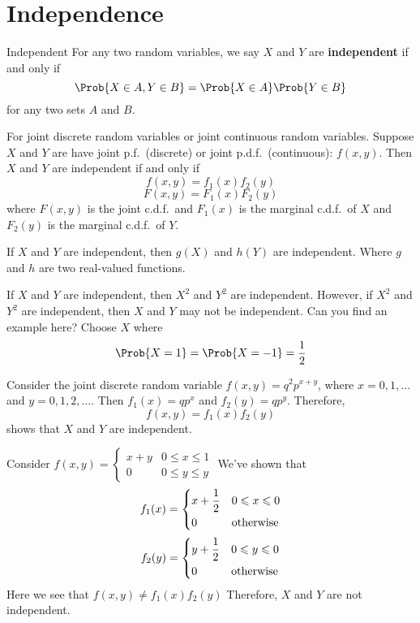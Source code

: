 \section{Independence}
\begin{Definition}{Independent}{}
    For any two random variables, we say $ X $ and $ Y $
    are \textbf{independent} if and only if
    \[ \Prob{X\in A,Y\in B}=\Prob{X\in A} \Prob{Y\in B} \]
    for any two sets $ A $ and $ B $.
\end{Definition}

\begin{Theorem}{}{}
    For joint discrete random variables or joint continuous random variables.
    Suppose $ X $ and $ Y $ are have joint p.f.\ (discrete)
    or joint p.d.f.\ (continuous): $ f(x,y) $. Then
    $ X $ and $ Y $ are independent if and only if
    \[ f(x,y)=f_1(x)f_2(y) \]
    \[ F(x,y)=F_1(x)F_2(y) \]
    where $ F(x,y) $ is the joint c.d.f.\
    and $ F_1(x) $ is the marginal c.d.f.\ of $ X $
    and $ F_2(y) $ is the marginal c.d.f.\ of $ Y $.
\end{Theorem}

\begin{Theorem}{}{}
    If $ X $ and $ Y $ are independent,
    then $ g(X) $ and $ h(Y) $ are independent.
    Where $ g $ and $ h $ are two real-valued functions.
\end{Theorem}

\begin{Example}{}{}
    If $ X $ and $ Y $ are independent,
    then $ X^2 $ and $ Y^2 $ are independent. However,
    if $ X^2 $ and $ Y^2 $ are independent, then $ X $
    and $ Y $ may not be independent. Can you find an example here?
    Choose $ X $ where
    \[ \Prob{X=1}
        =\Prob{X=-1}=\frac{1}{2} \]
\end{Example}

\begin{Example}{}{}
    Consider the joint discrete random variable
    $ f(x,y)=q^2 p^{x+y} $, where $ x=0,1,\ldots $
    and $ y=0,1,2,\ldots $. Then $ f_1(x)=qp^x $
    and $ f_2(y)=qp^y $. Therefore,
    \[ f(x,y)=f_1(x)f_2(y) \]
    shows that $ X $ and $ Y $ are independent.

    Consider $ \displaystyle
        f(x,y)=\begin{cases}
            x+y & 0\leqslant x\leqslant 1 \\
            0   & 0\leqslant y\leqslant y
        \end{cases} $
    We've shown that
    \[ f_1(x)=\begin{dcases}
            x+\frac{1}{2} & 0\leqslant x\leqslant 0 \\
            0             & \text{otherwise}
        \end{dcases} \]
    \[ f_2(y)=\begin{dcases}
            y+\frac{1}{2} & 0\leqslant y\leqslant 0 \\
            0             & \text{otherwise}
        \end{dcases} \]
    Here we see that $ f(x,y)\neq f_1(x)f_2(y) $
    Therefore, $ X $ and $ Y $ are not independent.
\end{Example}

